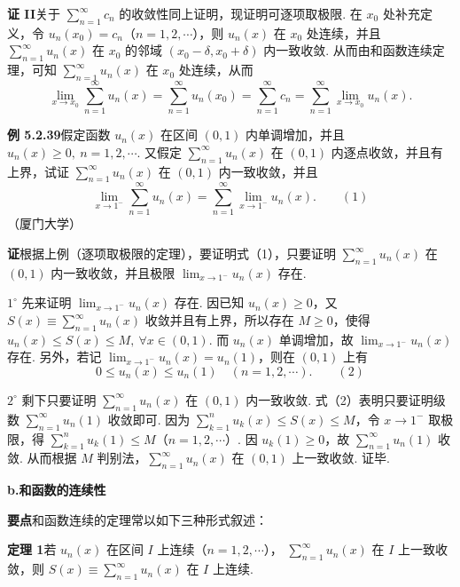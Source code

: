 \documentclass[UTF8, 12pt, fontset=fandol, oneside]{ctexart}
\begin{document}
\noindent\textbf{证 II}\quad 关于 $\displaystyle\sum_{n=1}^{\infty}c_n$ 的收敛性同上证明，现证明可逐项取极限.
在 $x_0$ 处补充定义，令 $u_n(x_0)=c_n$（$n=1,2,\cdots$），则 $u_n(x)$ 在
$x_0$ 处连续，并且 $\displaystyle\sum_{n=1}^{\infty}u_n(x)$ 在 $x_0$ 的邻域
$(x_0-\delta,x_0+\delta)$ 内一致收敛. 从而由和函数连续定理，可知
$\displaystyle\sum_{n=1}^{\infty}u_n(x)$ 在 $x_0$ 处连续，从而
\[
  \lim_{x\to x_0}\sum_{n=1}^{\infty}u_n(x)
  =\sum_{n=1}^{\infty}u_n(x_0)
  =\sum_{n=1}^{\infty}c_n
  =\sum_{n=1}^{\infty}\lim_{x\to x_0}u_n(x).
\]

\noindent\textbf{例 5.2.39}\quad 假定函数 $u_n(x)$ 在区间 $(0,1)$ 内单调增加，并且
$u_n(x)\ge0,\ n=1,2,\cdots$. 又假定 $\displaystyle\sum_{n=1}^{\infty}u_n(x)$ 在
$(0,1)$ 内逐点收敛，并且有上界，试证
$\displaystyle\sum_{n=1}^{\infty}u_n(x)$ 在 $(0,1)$ 内一致收敛，并且
\[
  \lim_{x\to1^-}\sum_{n=1}^{\infty}u_n(x)
  =\sum_{n=1}^{\infty}\lim_{x\to1^-}u_n(x).
\qquad(1)
\]
（厦门大学）

\noindent\textbf{证}\quad 根据上例（逐项取极限的定理），要证明式（1），只要证明
$\displaystyle\sum_{n=1}^{\infty}u_n(x)$ 在 $(0,1)$ 内一致收敛，并且极限
$\displaystyle\lim_{x\to1^-}u_n(x)$ 存在.

$1^\circ$ 先来证明 $\displaystyle\lim_{x\to1^-}u_n(x)$ 存在. 因已知
$u_n(x)\ge0$，又 $S(x)\equiv\displaystyle\sum_{n=1}^{\infty}u_n(x)$ 收敛并且有上界，所以存在
$M\ge0$，使得 $u_n(x)\le S(x)\le M,\ \forall x\in(0,1)$. 而 $u_n(x)$ 单调增加，故
$\displaystyle\lim_{x\to1^-}u_n(x)$ 存在. 另外，若记
$\displaystyle\lim_{x\to1^-}u_n(x)=u_n(1)$，则在 $(0,1)$ 上有
\[
  0\le u_n(x)\le u_n(1)\quad(n=1,2,\cdots).
\qquad(2)
\]

$2^\circ$ 剩下只要证明 $\displaystyle\sum_{n=1}^{\infty}u_n(x)$ 在 $(0,1)$ 内一致收敛. 式（2）表明只要证明级数
$\displaystyle\sum_{n=1}^{\infty}u_n(1)$ 收敛即可. 因为
$\displaystyle\sum_{k=1}^{n}u_k(x)\le S(x)\le M$，令 $x\to1^-$ 取极限，得
$\displaystyle\sum_{k=1}^{n}u_k(1)\le M$（$n=1,2,\cdots$）. 因
$u_k(1)\ge0$，故 $\displaystyle\sum_{n=1}^{\infty}u_n(1)$ 收敛. 从而根据
$M$ 判别法，$\displaystyle\sum_{n=1}^{\infty}u_n(x)$ 在 $(0,1)$ 上一致收敛. 证毕.

\noindent\textbf{b.\quad 和函数的连续性}

\noindent\textbf{要点}\quad 和函数连续的定理常以如下三种形式叙述：

\noindent\textbf{定理 1}\quad 若 $u_n(x)$ 在区间 $I$ 上连续（$n=1,2,\cdots$），
$\displaystyle\sum_{n=1}^{\infty}u_n(x)$ 在 $I$ 上一致收敛，则
$S(x)\equiv\displaystyle\sum_{n=1}^{\infty}u_n(x)$ 在 $I$ 上连续.
\end{document}

